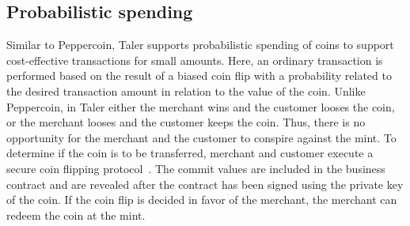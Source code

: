 \documentclass{llncs}
\begin{document}
%
%
%



\subsection{Probabilistic spending}

Similar to Peppercoin, Taler supports probabilistic spending of coins to
support cost-effective transactions for small amounts.  Here, an
ordinary transaction is performed based on the result of a biased coin
flip with a probability related to the desired transaction amount in
relation to the value of the coin.  Unlike Peppercoin, in Taler either
the merchant wins and the customer looses the coin, or the merchant
looses and the customer keeps the coin.  Thus, there is no opportunity
for the merchant and the customer to conspire against the mint.  To
determine if the coin is to be transferred, merchant and customer
execute a secure coin flipping protocol~\cite{blum1981}.  The commit
values are included in the business contract and are revealed after
the contract has been signed using the private key of the coin.  If
the coin flip is decided in favor of the merchant, the merchant can
redeem the coin at the mint.
\end{document}
